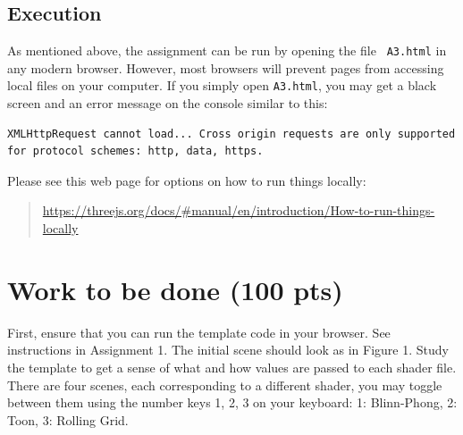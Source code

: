 \documentclass[12pt]{exam}
\begin{document}
\subsection{Execution}
As mentioned above, the assignment can be run by opening the file {\tt
  A3.html} in any modern browser. However, most browsers will prevent
pages from accessing local files on your computer. If you simply open
{\tt A3.html}, you may get a black screen and an error message on the
console similar to this:
\begin{lstlisting}[style = error]
    XMLHttpRequest cannot load... Cross origin requests are only supported for protocol schemes: http, data, https.
\end{lstlisting}

Please see this web page for options on how to run things locally:
\begin{quotation}
    {\footnotesize \url{https://threejs.org/docs/\#manual/en/introduction/How-to-run-things-locally}}
\end{quotation}




\section{Work to be done (100 pts)}

First, ensure that you can run the template code in your browser. See instructions in Assignment 1. The initial scene should look as in Figure 1. Study the template to get a sense of what and how values are passed to each shader file. There are four scenes, each corresponding
to a different shader, you may toggle between them using the number keys 1, 2, 3 on
your keyboard: 1: Blinn-Phong, 2: Toon, 3: Rolling Grid.
\end{document}
